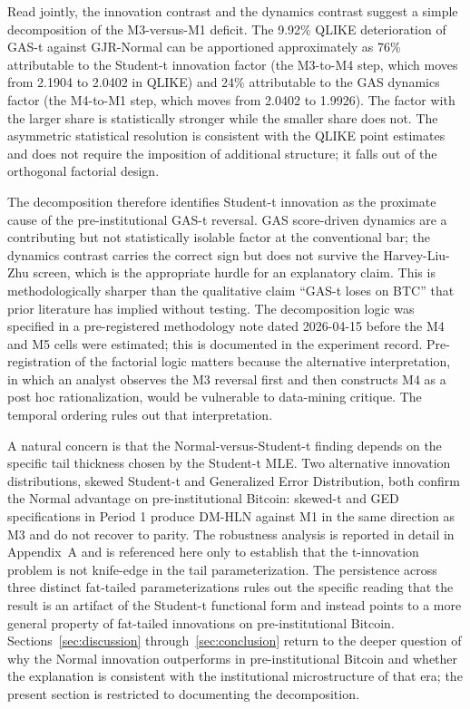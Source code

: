 Read jointly, the innovation contrast and the dynamics contrast suggest a simple decomposition of the M3-versus-M1 deficit. The 9.92\% QLIKE deterioration of GAS-t against GJR-Normal can be apportioned approximately as 76\% attributable to the Student-t innovation factor (the M3-to-M4 step, which moves from 2.1904 to 2.0402 in QLIKE) and 24\% attributable to the GAS dynamics factor (the M4-to-M1 step, which moves from 2.0402 to 1.9926). The factor with the larger share is statistically stronger while the smaller share does not. The asymmetric statistical resolution is consistent with the QLIKE point estimates and does not require the imposition of additional structure; it falls out of the orthogonal factorial design.

The decomposition therefore identifies Student-t innovation as the proximate cause of the pre-institutional GAS-t reversal. GAS score-driven dynamics are a contributing but not statistically isolable factor at the conventional bar; the dynamics contrast carries the correct sign but does not survive the Harvey-Liu-Zhu screen, which is the appropriate hurdle for an explanatory claim. This is methodologically sharper than the qualitative claim ``GAS-t loses on BTC'' that prior literature has implied without testing. The decomposition logic was specified in a pre-registered methodology note dated 2026-04-15 before the M4 and M5 cells were estimated; this is documented in the experiment record. Pre-registration of the factorial logic matters because the alternative interpretation, in which an analyst observes the M3 reversal first and then constructs M4 as a post hoc rationalization, would be vulnerable to data-mining critique. The temporal ordering rules out that interpretation.

A natural concern is that the Normal-versus-Student-t finding depends on the specific tail thickness chosen by the Student-t MLE. Two alternative innovation distributions, skewed Student-t and Generalized Error Distribution, both confirm the Normal advantage on pre-institutional Bitcoin: skewed-t and GED specifications in Period 1 produce DM-HLN against M1 in the same direction as M3 and do not recover to parity. The robustness analysis is reported in detail in Appendix~A and is referenced here only to establish that the t-innovation problem is not knife-edge in the tail parameterization. The persistence across three distinct fat-tailed parameterizations rules out the specific reading that the result is an artifact of the Student-t functional form and instead points to a more general property of fat-tailed innovations on pre-institutional Bitcoin. Sections~\ref{sec:discussion} through~\ref{sec:conclusion} return to the deeper question of why the Normal innovation outperforms in pre-institutional Bitcoin and whether the explanation is consistent with the institutional microstructure of that era; the present section is restricted to documenting the decomposition.

